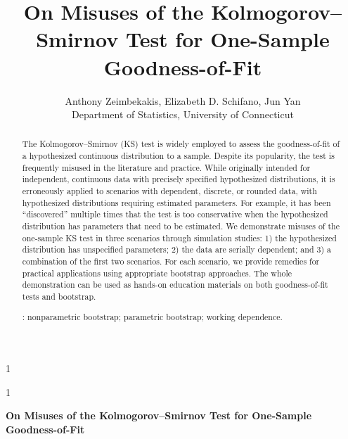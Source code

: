 \documentclass[12pt, letterpaper]{article}
\newcommand{\blind}{1}
\begin{document}

\blind
{
  \title{\bf On Misuses of the Kolmogorov--Smirnov Test for One-Sample 
	Goodness-of-Fit}
  \author{Anthony Zeimbekakis, %
  Elizabeth D. Schifano, %
  Jun Yan\\[1ex]
  Department of Statistics, University of Connecticut\\
}
\date{}
  \maketitle
} \fi

\blind
{
  \bigskip
  \bigskip
  \bigskip
  \begin{center}
    {\LARGE\bf On Misuses of the Kolmogorov--Smirnov Test for One-Sample 
	Goodness-of-Fit}
\end{center}
  \bigskip
} \fi


\doublespace

\begin{abstract}
The Kolmogorov--Smirnov (KS) test is widely employed to assess the
goodness-of-fit of a hypothesized continuous distribution to a sample.
Despite its popularity, the test is frequently misused in the literature and
practice. While originally intended for independent, continuous data with
precisely specified hypothesized distributions, it is erroneously applied to
scenarios with dependent, discrete, or rounded data, with hypothesized
distributions requiring estimated parameters. For example, it has been
``discovered'' multiple times that the test is too conservative when the 
hypothesized distribution has parameters that need to be estimated.
We demonstrate misuses of the one-sample KS test in
three scenarios through simulation studies:
1) the hypothesized distribution has unspecified parameters;
2) the data are serially dependent; and
3) a combination of the first two scenarios.
For each scenario, we provide remedies for practical applications using
appropriate bootstrap approaches.
The whole demonstration can be used as hands-on education materials on both
goodness-of-fit tests and bootstrap.

\bigskip
{}:
nonparametric bootstrap;
parametric bootstrap;
working dependence.
\end{abstract}
\end{document}
